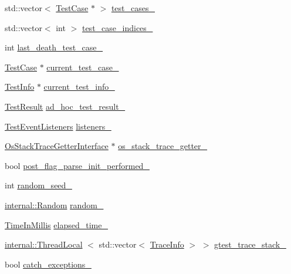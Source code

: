 \begin{DoxyCompactItemize}
\item 
std\-::vector$<$ \hyperlink{classtesting_1_1TestCase}{\-Test\-Case} $\ast$ $>$ \hyperlink{classtesting_1_1internal_1_1UnitTestImpl_ab62e4e13580e882140f8bf78a94ce669}{test\-\_\-cases\-\_\-}
\item 
std\-::vector$<$ int $>$ \hyperlink{classtesting_1_1internal_1_1UnitTestImpl_a537c435021d907aafe88070abe6db7a9}{test\-\_\-case\-\_\-indices\-\_\-}
\item 
int \hyperlink{classtesting_1_1internal_1_1UnitTestImpl_a93b260f5e9218dd561831f3135ac9f26}{last\-\_\-death\-\_\-test\-\_\-case\-\_\-}
\item 
\hyperlink{classtesting_1_1TestCase}{\-Test\-Case} $\ast$ \hyperlink{classtesting_1_1internal_1_1UnitTestImpl_a1518dcaae47f97490ebd5d3efe4f70f3}{current\-\_\-test\-\_\-case\-\_\-}
\item 
\hyperlink{classtesting_1_1TestInfo}{\-Test\-Info} $\ast$ \hyperlink{classtesting_1_1internal_1_1UnitTestImpl_a4c974b2eb5da1b40919bb6118c3a33f8}{current\-\_\-test\-\_\-info\-\_\-}
\item 
\hyperlink{classtesting_1_1TestResult}{\-Test\-Result} \hyperlink{classtesting_1_1internal_1_1UnitTestImpl_ae5fbed6752ae31d54b7db28c8a84df0a}{ad\-\_\-hoc\-\_\-test\-\_\-result\-\_\-}
\item 
\hyperlink{classtesting_1_1TestEventListeners}{\-Test\-Event\-Listeners} \hyperlink{classtesting_1_1internal_1_1UnitTestImpl_ac0e313bd41c6c104cbb057d42723574b}{listeners\-\_\-}
\item 
\hyperlink{classtesting_1_1internal_1_1OsStackTraceGetterInterface}{\-Os\-Stack\-Trace\-Getter\-Interface} $\ast$ \hyperlink{classtesting_1_1internal_1_1UnitTestImpl_a03a75f27d552174a5ba8f477f3f4f116}{os\-\_\-stack\-\_\-trace\-\_\-getter\-\_\-}
\item 
bool \hyperlink{classtesting_1_1internal_1_1UnitTestImpl_af27b4c10f54dbf7cf61814bd71e2f71d}{post\-\_\-flag\-\_\-parse\-\_\-init\-\_\-performed\-\_\-}
\item 
int \hyperlink{classtesting_1_1internal_1_1UnitTestImpl_a3076e24cbd93ed76f370a5a2fce53403}{random\-\_\-seed\-\_\-}
\item 
\hyperlink{classtesting_1_1internal_1_1Random}{internal\-::\-Random} \hyperlink{classtesting_1_1internal_1_1UnitTestImpl_ac270e1191e25343bb791c94ef3331a26}{random\-\_\-}
\item 
\hyperlink{namespacetesting_1_1internal_a9e0fb32f592d143f031a3431366adae0}{\-Time\-In\-Millis} \hyperlink{classtesting_1_1internal_1_1UnitTestImpl_a97b9c166ebee95ae4c9ef26cf3155617}{elapsed\-\_\-time\-\_\-}
\item 
\hyperlink{classtesting_1_1internal_1_1ThreadLocal}{internal\-::\-Thread\-Local}\*
$<$ std\-::vector$<$ \hyperlink{structtesting_1_1internal_1_1TraceInfo}{\-Trace\-Info} $>$ $>$ \hyperlink{classtesting_1_1internal_1_1UnitTestImpl_a90e2c9d96f24d3430189a4b850263ad0}{gtest\-\_\-trace\-\_\-stack\-\_\-}
\item 
bool \hyperlink{classtesting_1_1internal_1_1UnitTestImpl_ae7865b4eb9284346a5fd86cc41dc5e3f}{catch\-\_\-exceptions\-\_\-}
\end{DoxyCompactItemize}
